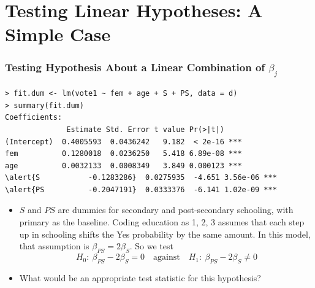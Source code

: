 \documentclass[xcolor=svgnames,9pt,english,aspectratio=169,t]{beamer}
\begin{document}
\section{Testing Linear Hypotheses: A Simple Case}


\begin{frame}[fragile]
\frametitle{Testing Hypothesis About a Linear Combination of $\beta_j$}
\footnotesize
{}
\begin{Verbatim}[fontsize=\footnotesize, frame=single, label=R Code, commandchars=\\\{\}]
> fit.dum <- lm(vote1 ~ fem + age + S + PS, data = d)
> summary(fit.dum)
Coefficients:
              Estimate Std. Error t value Pr(>|t|)
(Intercept)  0.4005593  0.0436242   9.182  < 2e-16 ***
fem          0.1280018  0.0236250   5.418 6.89e-08 ***
age          0.0032133  0.0008349   3.849 0.000123 ***
\alert{S           -0.1283286}  0.0275935  -4.651 3.56e-06 ***
\alert{PS          -0.2047191}  0.0333376  -6.141 1.02e-09 ***
\end{Verbatim}
\footnotesize
\begin{itemize}
\addtolength{\itemsep}{.5\baselineskip}
  \item $S$ and $PS$ are dummies for secondary and post-secondary schooling, with primary as the baseline.
  Coding education as 1, 2, 3 assumes that each step up in schooling shifts the Yes probability
  by the same amount. In this model, that assumption is $\beta_{PS}=2\beta_S$. So we test
  $$H_0: \ \beta_{PS}-2\beta_S=0 \quad \text{against} \quad H_1: \ \beta_{PS}-2\beta_S\neq 0$$
\vspace{-\baselineskip}
\item<2-> What would be an appropriate \alert{test statistic} for this hypothesis?
\end{itemize}
\end{frame}
\end{document}
